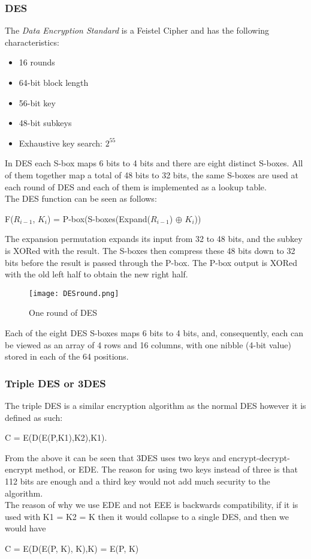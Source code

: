 \documentclass[a4paper]{article}
\begin{document}
\subsubsection{DES}
The \textit{Data Encryption Standard} is a Feistel Cipher and has the following characteristics:
\begin{itemize}
    \item 16 rounds
    \item 64-bit block length
    \item 56-bit key
    \item 48-bit subkeys
    \item Exhaustive key search: $2^{55}$
\end{itemize}
In DES each S-box maps 6 bits to 4 bits and there are eight distinct S-boxes. All of them together map a total of 48 bits to 32 bits, the same S-boxes are used at each round of DES and each of them is implemented as a lookup table.\\
The DES function can be seen as follows:
\begin{center}
    F($R_{i-1}$, $K_i$) = P-box(S-boxes(Expand($R_{i-1}$) $\oplus$ $K_{i}$))
\end{center}
The expansion permutation expands its input from 32 to 48 bits, and the subkey is XORed with the result. The S-boxes then compress these 48 bits down to 32 bits before the result is passed through the P-box. The P-box output is XORed with the old left half to obtain the new right half.

\begin{figure}[H]
    \centering
    \caption{One round of DES}
    \texttt{[image: DESround.png]}
\end{figure}
Each of the eight DES S-boxes maps 6 bits to 4 bits, and, consequently, each can be viewed as an array of 4 rows and 16 columns, with one nibble (4-bit value) stored in each of the 64 positions.

\subsubsection{Triple DES or 3DES}
The triple DES is a similar encryption algorithm as the normal DES however it is defined as such:
\begin{center}
    C = E(D(E(P,K1),K2),K1).
\end{center}{}
From the above it can be seen that 3DES uses two keys and encrypt-decrypt-encrypt method, or EDE. The reason for using two keys instead of three is that 112 bits are enough and a third key would not add much security to the algorithm.\\
The reason of why we use EDE and not EEE is backwards compatibility, if it is used with K1 = K2 = K then it would collapse to a single DES, and then we would have
\begin{center}
    C = E(D(E(P, K), K),K) = E(P, K)
\end{center}{}
\end{document}
